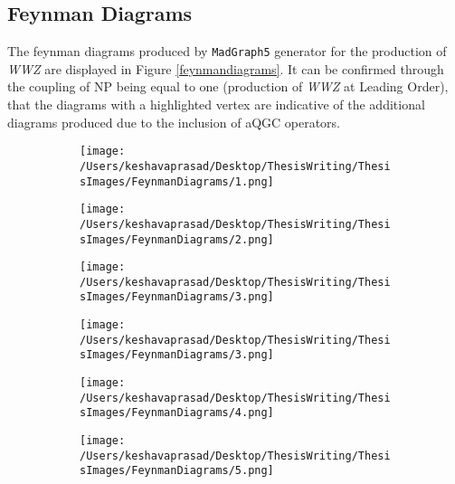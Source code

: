 \subsection{Feynman Diagrams}
The feynman diagrams produced by \texttt{MadGraph5} generator for the production of \textit{WWZ} are displayed in Figure \ref{feynmandiagrams}. It can be confirmed through the coupling of NP being equal to one (production of \textit{WWZ} at Leading Order), that the diagrams with a highlighted vertex are indicative of the additional diagrams produced due to the inclusion of aQGC operators. 

\begin{figure}
	\centering
	\begin{subfigure}[b]{0.3\textwidth}
		\centering
		\texttt{[image: /Users/keshavaprasad/Desktop/ThesisWriting/ThesisImages/FeynmanDiagrams/1.png]}
	\end{subfigure}
	\hfill
	\begin{subfigure}[b]{0.3\textwidth}
		\centering
		\texttt{[image: /Users/keshavaprasad/Desktop/ThesisWriting/ThesisImages/FeynmanDiagrams/2.png]}
	\end{subfigure}
	\hfill
	\begin{subfigure}[b]{0.3\textwidth}
		\centering
		\texttt{[image: /Users/keshavaprasad/Desktop/ThesisWriting/ThesisImages/FeynmanDiagrams/3.png]}
	\end{subfigure}
\begin{subfigure}[b]{0.3\textwidth}
	\centering
	\texttt{[image: /Users/keshavaprasad/Desktop/ThesisWriting/ThesisImages/FeynmanDiagrams/3.png]}
\end{subfigure}
\begin{subfigure}[b]{0.3\textwidth}
	\centering
	\texttt{[image: /Users/keshavaprasad/Desktop/ThesisWriting/ThesisImages/FeynmanDiagrams/4.png]}
\end{subfigure}
\begin{subfigure}[b]{0.3\textwidth}
	\centering
	\texttt{[image: /Users/keshavaprasad/Desktop/ThesisWriting/ThesisImages/FeynmanDiagrams/5.png]}
\end{subfigure}
\begin{subfigure}[b]{0.3\textwidth}

\end{subfigure}
\end{figure}
